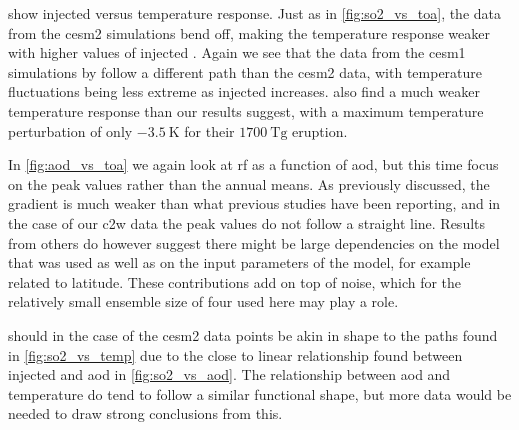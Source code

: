 \documentclass{ametsocV5}
\newcommand{\iso}[1][i]{{#1}njected \ce{SO2}}
\begin{document}
 show \iso{} versus temperature response. Just as in
\cref{fig:so2_vs_toa}, the data from the \ac{cesm2} simulations bend off, making the
temperature response weaker with higher values of \iso. Again we see that the data from
the \ac{cesm1} simulations by \citet{ottobliesner2016} follow a different path than the
\ac{cesm2} data, with temperature fluctuations being less extreme as \iso{} increases.
\citet{timmreck2010} also find a much weaker temperature response than our results
suggest, with a maximum temperature perturbation of only \(\SI{-3.5}{\kelvin}\) for
their \(\SI{1700}{\tera\gram}\)  eruption.


In \cref{fig:aod_vs_toa} we again look at \ac{rf} as a function of \ac{aod}, but this
time focus on the peak values rather than the annual means. As previously discussed, the
gradient is much weaker than what previous studies have been reporting, and in the case
of our \ac{c2w} data the peak values do not follow a straight line. Results from others
do however suggest there might be large dependencies on the model that was used as well
as on the input parameters of the model, for example related to latitude. These
contributions add on top of noise, which for the relatively small ensemble size of four
used here may play a role.


 should in the case of the \ac{cesm2} data points be akin in shape
to the paths found in \cref{fig:so2_vs_temp} due to the close to linear relationship
found between \iso{} and \ac{aod} in \cref{fig:so2_vs_aod}. The relationship between
\ac{aod} and temperature do tend to follow a similar functional shape, but more data
would be needed to draw strong conclusions from this.
\end{document}
